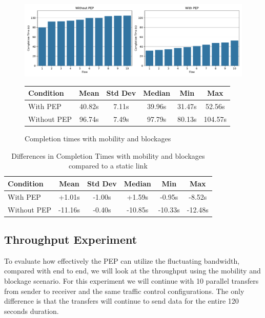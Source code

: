 \documentclass[a4paper,english, 11pt]{report}
\begin{document}
\begin{figure}[h!] %
	\centering
	\includegraphics[scale=0.40]{../diagrams/witestlab/mobb_cubic_bar.pdf}
	\begin{tabularx}{\linewidth}{lCCCCC}
\toprule
Condition & Mean & Std Dev & Median & Min & Max \\
\midrule
With PEP & 40.82s & 7.11s & 39.96s & 31.47s & 52.56s\\
Without PEP & 96.74s & 7.49s & 97.79s & 80.13s & 104.57s\\
\bottomrule
\end{tabularx}
  	\caption{Completion times with mobility and blockages}
  	\label{fig:witestlab_mobb_fcts}
\end{figure}

\begin{table}[h!]
\centering
\begin{tabularx}{\linewidth}{lCCCCC}
\toprule
Condition & Mean & Std Dev & Median & Min & Max \\
\midrule
With PEP & +1.01s & -1.00s & +1.59s & -0.95s & -8.52s \\
Without PEP & -11.16s & -0.40s & -10.85s & -10.33s & -12.48s \\
\bottomrule
\end{tabularx}
\caption{Differences in Completion Times with mobility and blockages compared to a static link}
\label{tab:mobb_fct_diff}
\end{table}

\subsection{Throughput Experiment}
To evaluate how effectively the PEP can utilize the fluctuating bandwidth, compared with end to end, we will look at the throughput using the mobility and blockage scenario. For this experiment we will continue with 10 parallel transfers from sender to receiver and the same traffic control configurations. The only difference is that the transfers will continue to send data for the entire 120 seconds duration.\\
\end{document}
